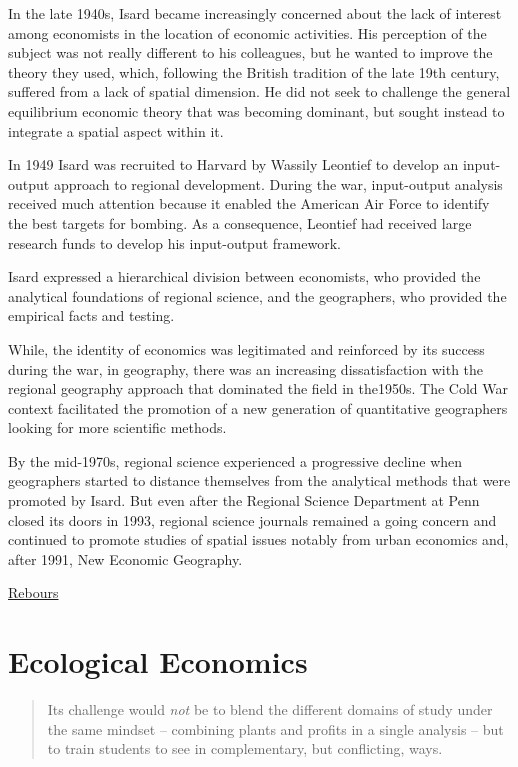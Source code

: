 \documentclass[
]{book}
\begin{document}
In the late 1940s, Isard became increasingly concerned about the lack of interest among economists in the location of economic activities. His perception of the subject was not really different to his colleagues, but he wanted to improve the theory they used, which, following the British tradition of the late 19th century, suffered from a lack of spatial dimension. He did not seek to challenge the general equilibrium economic theory that was becoming dominant, but sought instead to integrate a spatial aspect within it.

In 1949 Isard was recruited to Harvard by Wassily Leontief to develop an input-output approach to regional development. During the war, input-output analysis received much attention because it enabled the American Air Force to identify the best targets for bombing. As a consequence, Leontief had received large research funds to develop his input-output framework.

Isard expressed a hierarchical division between economists, who provided
the analytical foundations of regional science,
and the geographers, who provided the empirical facts and testing.

While, the identity of economics was legitimated and reinforced by its success during the war, in geography, there was an increasing dissatisfaction with the regional geography approach that dominated the field in the1950s. The Cold War context facilitated the promotion of a new generation of quantitative geographers looking for more scientific methods.

By the mid-1970s, regional science experienced a progressive decline when geographers started to distance themselves from the analytical methods that were promoted by Isard. But even after the Regional Science Department at Penn closed its doors in 1993, regional science journals remained a going concern and continued to promote studies of spatial issues notably from urban economics and, after 1991, New Economic Geography.

\href{https://hscif.org/economists-in-the-city-rebours/}{Rebours}

\hypertarget{ecological-economics}{%
\chapter{Ecological Economics}\label{ecological-economics}}

\begin{quote}
Its challenge would \emph{not} be to blend the different domains of study under the same mindset -- combining plants and profits in a single analysis -- but to train students to see in complementary, but conflicting, ways.
\end{quote}
\end{document}
